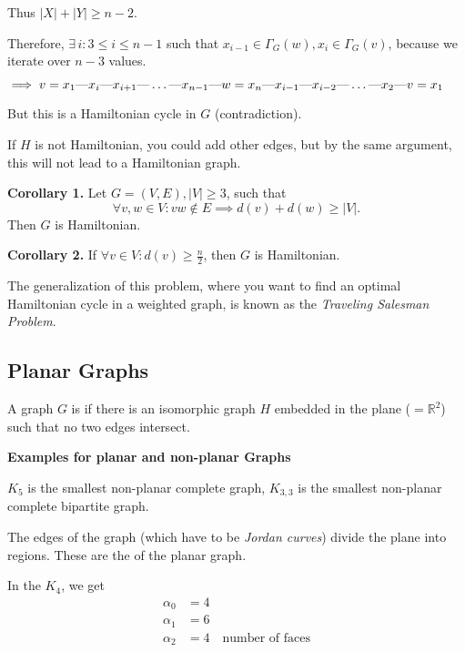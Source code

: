 Thus $|X| + |Y| \geq n-2$.

Therefore, $\exists\,i: 3 ≤ i ≤ n-1$ such that
$x_{i-1}\in \Gamma_G(w), x_i\in\Gamma_G(v)$, because we iterate over $n-3$ values.

$\implies \path{v=x_1, x_i, x_{i+1}, \ldots, x_{n-1}, w=x_n, x_{i-1}, x_{i-2}, \ldots, x_2, v=x_1}$

But this is a Hamiltonian cycle in $G$ (contradiction).

If $H$ is not Hamiltonian, you could add other edges, but by the same argument, this will not lead to a Hamiltonian graph.

\textbf{Corollary 1.}
Let $G=(V,E), |V| ≥ 3$, such that
\[
    \forall v,w\in V: vw\not\in E\implies d(v) + d(w) \geq |V|.
\]
Then $G$ is Hamiltonian.

\textbf{Corollary 2.}
If 
$\forall v \in V : d(v) \geq \frac{n}{2}$,
then $G$ is Hamiltonian.

The generalization of this problem, where you want to find an optimal Hamiltonian cycle in a weighted graph, is known as the \emph{Traveling Salesman Problem}.


\subsection{Planar Graphs}

\begin{definition}
A graph $G$ is  if there is an isomorphic graph $H$ embedded in the plane ($= \mathbb{R}^2$) such that no two edges intersect.
\end{definition}

\textbf{Examples for planar and non-planar Graphs}


$K_5$ is the smallest non-planar complete graph, $K_{3,3}$ is the smallest non-planar complete bipartite graph.

\begin{definition}
The edges of the graph (which have to be \emph{Jordan curves}) divide the plane into regions. These are the  of the planar graph.
\end{definition}



In the $K_4$, we get
\begin{align*}
    \alpha_0 &= 4 \\
    \alpha_1 &= 6 \\
    \alpha_2 &= 4\quad\text{number of faces}
\end{align*}

